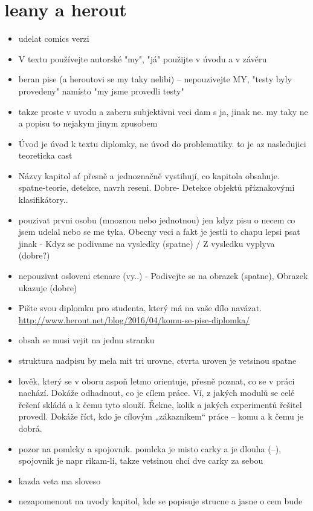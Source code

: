 \section{leany a herout}
\begin{itemize}
  \item udelat comics verzi
  \item V textu používejte autorské "my", "já" použijte v úvodu a v závěru
  \item beran pise (a heroutovi se my taky nelibi) -- nepouzivejte MY, "testy byly provedeny" namísto "my jsme provedli testy"
  \item takze proste v uvodu a zaberu subjektivni veci dam s ja, jinak ne. my taky ne a popisu to nejakym jinym zpusobem
  \item Úvod je úvod k textu diplomky, ne úvod do problematiky. to je az nasledujici teoreticka cast
  \item Názvy kapitol ať přesně a jednoznačně vystihují, co kapitola obsahuje. spatne-teorie, detekce, navrh reseni. Dobre- Detekce objektů příznakovými klasifikátory..
  \item pouzivat prvni osobu (mnoznou nebo jednotnou) jen kdyz pisu o necem co jsem udelal nebo se me tyka. Obecny veci a fakt je jestli to chapu lepsi psat jinak - Kdyz se podivame na vysledky (spatne) / Z vysledku vyplyva (dobre?)
  \item nepouzivat osloveni ctenare (vy..) - Podivejte se na obrazek (spatne), Obrazek ukazuje (dobre)
  \item Pište svou diplomku pro studenta, který má na vaše dílo navázat. \url{http://www.herout.net/blog/2016/04/komu-se-pise-diplomka/}
  \item obsah se musi vejit na jednu stranku
  \item struktura nadpisu by mela mit tri urovne, ctvrta uroven je vetsinou spatne
  \item lověk, který se v oboru aspoň letmo orientuje, přesně poznat, co se v práci nachází. Dokáže odhadnout, co je cílem práce. Ví, z jakých modulů se celé řešení skládá a k čemu tyto slouží. Řekne, kolik a jakých experimentů řešitel provedl. Dokáže říct, kdo je cílovým „zákazníkem“ práce – komu a k čemu je dobrá.
  \item pozor na pomlcky a spojovnik. pomlcka je misto carky a je dlouha (--), spojovnik je napr rikam-li, takze vetsinou chci dve carky za sebou
  \item kazda veta ma sloveso
  \item nezapomenout na uvody kapitol, kde se popisuje strucne a jasne o cem bude
\end{itemize}